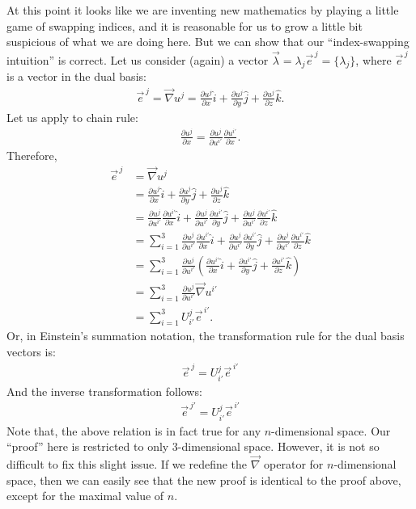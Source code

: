 \documentclass{book}
\theoremstyle{definition}
\begin{document}
At this point it looks like we are inventing new mathematics by playing a little game of swapping indices, and it is reasonable for us to grow a little bit suspicious of what we are doing here. But we can show that our ``index-swapping intuition'' is correct. Let us consider (again) a vector $\vec{\lambda} = \lambda_j\vec{e}^{\,j} = \{ \lambda_j\}$, where $\vec{e}^{\,j}$ is a vector in the dual basis:
\begin{align*}
\vec{e}^{\,j} = \vec{\nabla}u^j = \frac{\partial u^j}{\partial x}\hat{i} + \frac{\partial u^j}{\partial y}\hat{j} + \frac{\partial u^j}{\partial z}\hat{k}.
\end{align*}
Let us apply to chain rule:
\begin{align*}
\frac{\partial u^j}{\partial x} = \frac{\partial u^j}{\partial u^{i'}}\frac{\partial u^{i'}}{\partial x}.
\end{align*}
Therefore,
\begin{align*}
\vec{e}^{\,j} &= \vec{\nabla}u^j\\
&= \frac{\partial u^j}{\partial x}\hat{i} + \frac{\partial u^j}{\partial y}\hat{j} + \frac{\partial u^j}{\partial z}\hat{k}\\
&= \frac{\partial u^j}{\partial u^{i'}}\frac{\partial u^{i'}}{\partial x}\hat{i} + \frac{\partial u^j}{\partial u^{i'}}\frac{\partial u^{i'}}{\partial y}\hat{j} + \frac{\partial u^j}{\partial u^{i'}}\frac{\partial u^{i'}}{\partial z}\hat{k}\\
&= \sum_{i=1}^{3}\frac{\partial u^j}{\partial u^{i'}}\frac{\partial u^{i'}}{\partial x}\hat{i} + \frac{\partial u^j}{\partial u^{i'}}\frac{\partial u^{i'}}{\partial y}\hat{j} + \frac{\partial u^j}{\partial u^{i'}}\frac{\partial u^{i'}}{\partial z}\hat{k}\\
&= \sum_{i=1}^{3}\frac{\partial u^j}{\partial u^{i'}}\left( \frac{\partial u^{i'}}{\partial x}\hat{i} + \frac{\partial u^{i'}}{\partial y}\hat{j} + \frac{\partial u^{i'}}{\partial z}\hat{k}\right) \\
&= \sum_{i=1}^{3}\frac{\partial u^j}{\partial u^{i'}}\vec{\nabla}u^{i'}\\
&= \sum_{i=1}^{3}U^{j}_{i'}\vec{e}^{\,i'}.
\end{align*}
Or, in Einstein's summation notation, the transformation rule for the dual basis vectors is:
\begin{align*}
\boxed{\vec{e}^{\,j} = U^j_{i'}\vec{e}^{\,i'}}
\end{align*}
And the inverse transformation follows:
\begin{align*}
\boxed{\vec{e}^{\,j'} = U^{j}_{i'}\vec{e}^{\,i'}}
\end{align*}
Note that, the above relation is in fact true for any $n$-dimensional space. Our ``proof'' here is restricted to only 3-dimensional space. However, it is not so difficult to fix this slight issue. If we redefine the $\vec{\nabla}$ operator for $n$-dimensional space, then we can easily see that the new proof is identical to the proof above, except for the maximal value of $n$. \\
\end{document}
